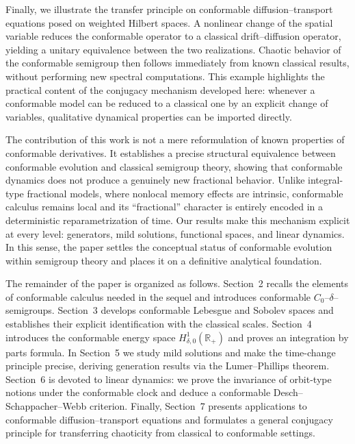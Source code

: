 \documentclass[preprint,12pt]{elsarticle}
\begin{document}
Finally, we illustrate the transfer principle on conformable diffusion--transport equations posed on weighted Hilbert spaces. A nonlinear change of the spatial variable reduces the conformable operator to a classical drift--diffusion operator, yielding a unitary equivalence between the two realizations. Chaotic behavior of the conformable semigroup then follows immediately from known classical results, without performing new spectral computations. This example highlights the practical content of the conjugacy mechanism developed here: whenever a conformable model can be reduced to a classical one by an explicit change of variables, qualitative dynamical properties can be imported directly.

The contribution of this work is not a mere reformulation of known properties of conformable derivatives. It establishes a precise structural equivalence between conformable evolution and classical semigroup theory, showing that conformable dynamics does not produce a genuinely new fractional behavior. Unlike integral-type fractional models, where nonlocal memory effects are intrinsic, conformable calculus remains local and its ``fractional'' character is entirely encoded in a deterministic reparametrization of time. Our results make this mechanism explicit at every level: generators, mild solutions, functional spaces, and linear dynamics. In this sense, the paper settles the conceptual status of conformable evolution within semigroup theory and places it on a definitive analytical foundation.

The remainder of the paper is organized as follows. Section~2 recalls the elements of conformable calculus needed in the sequel and introduces conformable $C_0$--$\delta$--semigroups. Section~3 develops conformable Lebesgue and Sobolev spaces and establishes their explicit identification with the classical scales. Section~4 introduces the conformable energy space $H^1_{\delta,0}(\mathbb{R}_+)$ and proves an integration by parts formula. In Section~5 we study mild solutions and make the time-change principle precise, deriving generation results via the Lumer--Phillips theorem. Section~6 is devoted to linear dynamics: we prove the invariance of orbit-type notions under the conformable clock and deduce a conformable Desch--Schappacher--Webb criterion. Finally, Section~7 presents applications to conformable diffusion--transport equations and formulates a general conjugacy principle for transferring chaoticity from classical to conformable settings.
\end{document}
